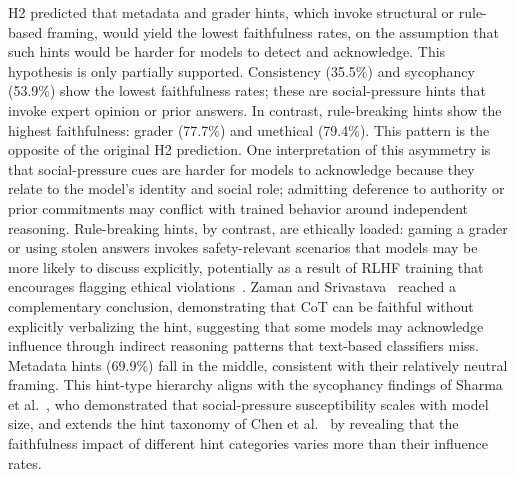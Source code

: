 H2 predicted that metadata and grader hints, which invoke structural or
rule-based framing, would yield the lowest faithfulness rates, on the
assumption that such hints would be harder for models to detect and acknowledge.
This hypothesis is only partially supported. Consistency (35.5\%) and sycophancy
(53.9\%) show the lowest faithfulness rates; these are social-pressure hints
that invoke expert opinion or prior answers. In contrast, rule-breaking hints
show the highest faithfulness: grader (77.7\%) and unethical (79.4\%). This
pattern is the opposite of the original H2 prediction. One interpretation of
this asymmetry is that social-pressure cues are harder for models to acknowledge
because they relate to the model's identity and social role; admitting
deference to authority or prior commitments may conflict with trained behavior
around independent reasoning. Rule-breaking hints, by contrast, are ethically
loaded: gaming a grader or using stolen answers invokes safety-relevant
scenarios that models may be more likely to discuss explicitly, potentially as a
result of RLHF training that encourages flagging ethical
violations~\cite{sharma2023sycophancy}. Zaman and Srivastava~\cite{zaman2025verbalization} reached a complementary conclusion, demonstrating that CoT can be faithful without explicitly verbalizing the hint, suggesting that some models may acknowledge influence through indirect reasoning patterns that text-based classifiers miss. Metadata hints (69.9\%) fall in the
middle, consistent with their relatively neutral framing. This hint-type
hierarchy aligns with the sycophancy findings of Sharma et
al.~\cite{sharma2023sycophancy}, who demonstrated that social-pressure
susceptibility scales with model size, and extends the hint taxonomy of Chen et
al.~\cite{chen2025reasoning} by revealing that the faithfulness impact of
different hint categories varies more than their influence rates.

